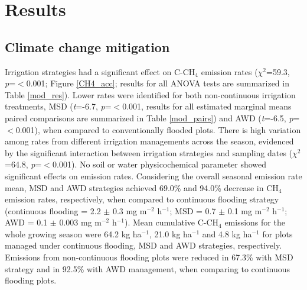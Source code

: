 \section{Results}
\label{sec:results}

\subsection{Climate change mitigation} 

Irrigation strategies had a significant effect on C-CH$_{4}$ emission rates ($\chi^2$=59.3, \textit{p}=$<$0.001; Figure \ref{CH4_acc}; results for all ANOVA tests are summarized in Table \ref{mod_res}). Lower rates were identified for both non-continuous irrigation treatments, MSD (\textit{t}=-6.7, \textit{p}=$<$0.001, results for all estimated marginal means paired comparisons are summarized in Table \ref{mod_pairs}) and AWD (\textit{t}=-6.5, \textit{p}=$<$0.001), when compared to conventionally flooded plots. There is high variation among rates from different irrigation managements across the season, evidenced by the significant interaction between irrigation strategies and sampling dates ($\chi^2$=64.8, \textit{p}=$<$0.001). No soil or water physicochemical parameter showed significant effects on emission rates. Considering the overall seasonal emission rate mean, MSD and AWD strategies achieved 69.0\% and 94.0\% decrease in CH$_{4}$ emission rates, respectively, when compared to continuous flooding strategy (continuous flooding = 2.2 $\pm$ 0.3 mg m$^{-2}$ h$^{-1}$; MSD = 0.7 $\pm$ 0.1 mg m$^{-2}$ h$^{-1}$; AWD = 0.1 $\pm$ 0.003 mg m$^{-2}$ h$^{-1}$). Mean cumulative C-CH$_{4}$ emissions for the whole growing season were 64.2 kg ha$^{-1}$, 21.0 kg ha$^{-1}$ and 4.8 kg ha$^{-1}$ for plots managed under continuous flooding, MSD and AWD strategies, respectively. Emissions from non-continuous flooding plots were reduced in 67.3\% with MSD strategy and in 92.5\% with AWD management, when comparing to continuous flooding plots.\\ 

